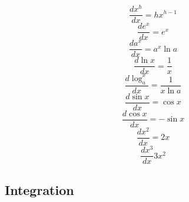 	\begin{equation}
		\frac{dx^h}{dx} = hx^{h-1}
	\end{equation}
	\begin{equation}
		\frac{de^x}{dx} = e^x
	\end{equation}
	\begin{equation}
		\frac{da^x}{dx} = a^x \ln a
	\end{equation}
	\begin{equation}
		\frac{d\ln x}{dx} = \frac{1}{x}
	\end{equation}
	\begin{equation}
		\frac{d\log_a^x}{dx} = \frac{1}{x\ln a}
	\end{equation}
	\begin{equation}
		\frac{d\sin x}{dx} = \cos x
	\end{equation}
	\begin{equation}
		\frac{d\cos x}{dx} = -\sin x
	\end{equation}
	\begin{equation}
		\frac{dx^2}{dx} = 2x
	\end{equation}
	\begin{equation}
		\frac{dx^3}{dx} 3x^2
	\end{equation}
	
		
	\subsection{Integration}
	
